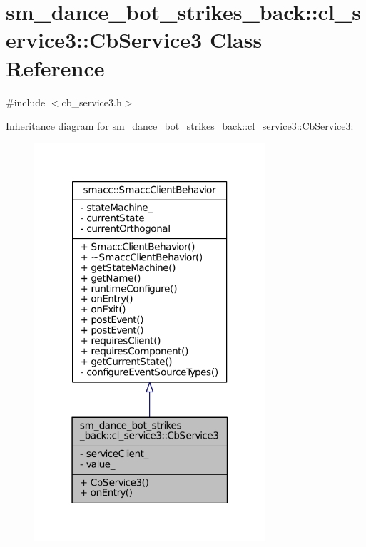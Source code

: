 \hypertarget{classsm__dance__bot__strikes__back_1_1cl__service3_1_1CbService3}{}\section{sm\+\_\+dance\+\_\+bot\+\_\+strikes\+\_\+back\+:\+:cl\+\_\+service3\+:\+:Cb\+Service3 Class Reference}
\label{classsm__dance__bot__strikes__back_1_1cl__service3_1_1CbService3}


{\ttfamily \#include $<$cb\+\_\+service3.\+h$>$}



Inheritance diagram for sm\+\_\+dance\+\_\+bot\+\_\+strikes\+\_\+back\+:\+:cl\+\_\+service3\+:\+:Cb\+Service3\+:
\nopagebreak
\begin{figure}[H]
\begin{center}
\leavevmode
\includegraphics[width=243pt]{classsm__dance__bot__strikes__back_1_1cl__service3_1_1CbService3__inherit__graph}
\end{center}
\end{figure}


